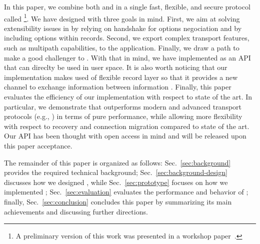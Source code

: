 In this paper, we combine both \tcp and \tls in a single fast, flexible, and secure protocol called \textbf{\tcpls}\footnote{A preliminary version of this work was presented in a workshop paper~\cite{rochet2020tcpls}.}.  We have designed \tcpls with three goals in mind.  First, we aim at solving extensibility issues in \tcp by relying on \tls handshake for \tcp options negociation and by including \tcp options within \tls records. Second, we export complex transport features, such as multipath capabilities, to the application.  Finally, we draw a path to make \tcpls a good challenger to \quic. With that in mind, we have implemented \tcpls as an API that can direclty be used in user space.  It is also worth noticing that our implementation makes used of \tls flexible record layer so that it provides a new channel to exchange information between \tcpls information .  Finally, this paper evaluates the efficiency of our \tcpls implementation with respect to state of the art.  In particular, we demonstrate that \tcpls outperforms modern and advanced transport protocols (e.g., \quic) in terms of pure performance, while allowing more flexibility with respect to recovery and connection migration compared to state of the art.  Our \tcpls API has been thought with open access in mind and will be released upon this paper acceptance.

The remainder of this paper is organized as follows: Sec.~\ref{sec:background} provides the required technical background; Sec.~\ref{sec:background-design} discusses how we designed \tcpls, while Sec.~\ref{sec:prototype} focuses on how we implemented \tcpls; Sec.~\ref{sec:evaluation} evaluates the performance and behavior of \tcpls;  finally, Sec.~\ref{sec:conclusion} concludes this paper by summarizing its main achievements and discussing further directions.





